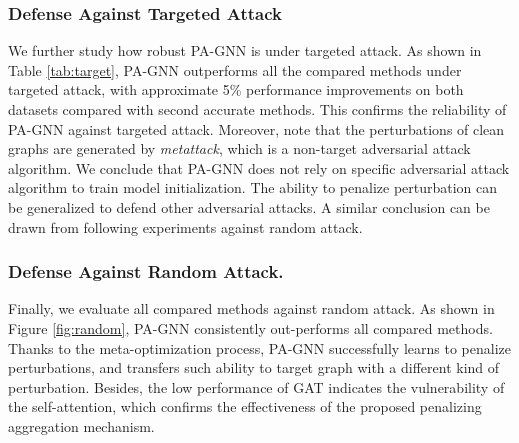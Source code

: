 \documentclass[sigconf]{acmart}
\newcommand{\our}{{PA-GNN}\xspace}
\newcommand{\ours}{{PA-GNN}\xspace}
\begin{document}
\subsubsection{Defense Against Targeted Attack}
We further study how robust \our is under targeted attack.
As shown in Table \ref{tab:target}, \our outperforms all the compared methods under targeted attack, with approximate 5\% performance improvements on both datasets compared with second accurate methods.
This confirms the reliability of \our against targeted attack.
Moreover, note that the perturbations of clean graphs are generated by \textit{metattack}, which is a non-target adversarial attack algorithm. We conclude that \ours does not rely on specific adversarial attack algorithm to train model initialization. The ability to penalize perturbation can be generalized to defend other adversarial attacks. A similar conclusion can be drawn from following experiments against random attack.


\subsubsection{Defense Against Random Attack.}
Finally, we evaluate all compared methods against random attack. As shown in Figure \ref{fig:random}, \ours consistently out-performs all compared methods. Thanks to the meta-optimization process, \ours successfully learns to penalize perturbations, and transfers such ability to target graph with a different kind of perturbation. Besides, the low performance of GAT indicates the vulnerability of the self-attention, which confirms the effectiveness of the proposed penalizing aggregation mechanism.
\end{document}

